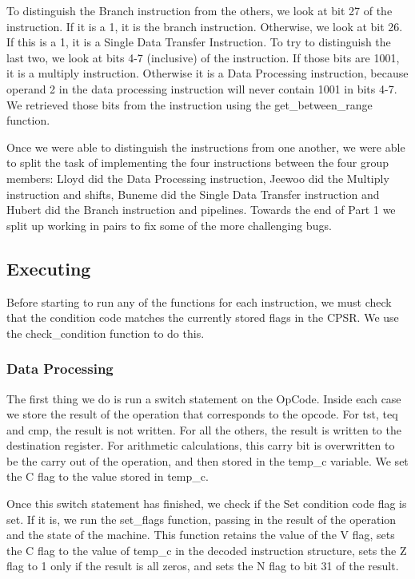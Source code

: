 \documentclass[a4paper]{article}
\begin{document}
To distinguish the Branch instruction from the others, we look at bit 27 of the instruction. If it is a 1, it is the branch instruction. Otherwise, we look at bit 26. If this is a 1, it is a Single Data Transfer Instruction. To try to distinguish the last two, we look at bits 4-7 (inclusive) of the instruction. If those bits are 1001, it is a multiply instruction. Otherwise it is a Data Processing instruction, because operand 2 in the data processing instruction will never contain 1001 in bits 4-7. We retrieved those bits from the instruction using the get\_between\_range function.

Once we were able to distinguish the instructions from one another, we were able to split the task of implementing the four instructions between the four group members: Lloyd did the Data Processing instruction, Jeewoo did the Multiply instruction and shifts, Buneme did the Single Data Transfer instruction and Hubert did the Branch instruction and pipelines. Towards the end of Part 1 we split up working in pairs to fix some of the more challenging bugs.

\subsection{Executing}
Before starting to run any of the functions for each instruction, we must check that the condition code matches the currently stored flags in the CPSR. We use the check\_condition function to do this.

\subsubsection{Data Processing}
The first thing we do is run a switch statement on the OpCode. Inside each case we store the result of the operation that corresponds to the opcode. For tst, teq and cmp, the result is not written. For all the others, the result is written to the destination register. For arithmetic calculations, this carry bit is overwritten to be the carry out of the operation, and then stored in the temp\_c variable. We set the C flag to the value stored in temp\_c.

Once this switch statement has finished, we check if the Set condition code flag is set. If it is, we run the set\_flags function, passing in the result of the operation and the state of the machine. This function retains the value of the V flag, sets the C flag to the value of temp\_c in the decoded instruction structure, sets the Z flag to 1 only if the result is all zeros, and sets the N flag to bit 31 of the result.
\end{document}
